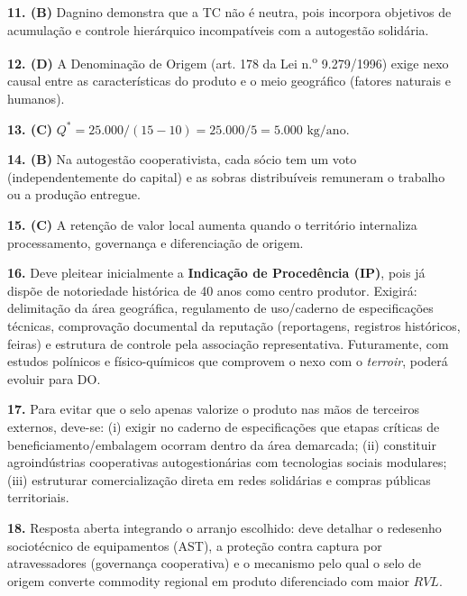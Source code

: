 \begin{boxGabarito}
\textbf{11. (B)} Dagnino demonstra que a TC não é neutra, pois incorpora objetivos de acumulação e controle hierárquico incompatíveis com a autogestão solidária.

\textbf{12. (D)} A Denominação de Origem (art. 178 da Lei n.\textsuperscript{o} 9.279/1996) exige nexo causal entre as características do produto e o meio geográfico (fatores naturais e humanos).

\textbf{13. (C)} $Q^* = 25.000 / (15 - 10) = 25.000 / 5 = 5.000\text{ kg/ano}$.

\textbf{14. (B)} Na autogestão cooperativista, cada sócio tem um voto (independentemente do capital) e as sobras distribuíveis remuneram o trabalho ou a produção entregue.

\textbf{15. (C)} A retenção de valor local aumenta quando o território internaliza processamento, governança e diferenciação de origem.

\textbf{16.} Deve pleitear inicialmente a \textbf{Indicação de Procedência (IP)}, pois já dispõe de notoriedade histórica de 40 anos como centro produtor. Exigirá: delimitação da área geográfica, regulamento de uso/caderno de especificações técnicas, comprovação documental da reputação (reportagens, registros históricos, feiras) e estrutura de controle pela associação representativa. Futuramente, com estudos polínicos e físico-químicos que comprovem o nexo com o \textit{terroir}, poderá evoluir para DO.

\textbf{17.} Para evitar que o selo apenas valorize o produto nas mãos de terceiros externos, deve-se: (i) exigir no caderno de especificações que etapas críticas de beneficiamento/embalagem ocorram dentro da área demarcada; (ii) constituir agroindústrias cooperativas autogestionárias com tecnologias sociais modulares; (iii) estruturar comercialização direta em redes solidárias e compras públicas territoriais.

\textbf{18.} Resposta aberta integrando o arranjo escolhido: deve detalhar o redesenho sociotécnico de equipamentos (AST), a proteção contra captura por atravessadores (governança cooperativa) e o mecanismo pelo qual o selo de origem converte commodity regional em produto diferenciado com maior $RVL$.
\end{boxGabarito}

